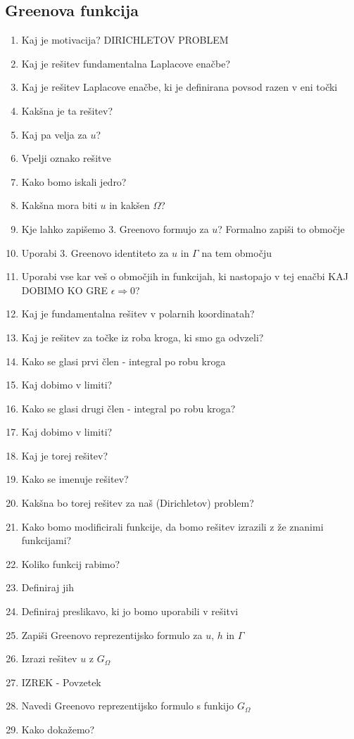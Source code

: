 \documentclass{article}
\begin{document}
    \subsection{Greenova funkcija}
    \begin{enumerate}
        \item Kaj je motivacija?
        DIRICHLETOV PROBLEM
        \item Kaj je rešitev fundamentalna Laplacove enačbe?
        \item Kaj je rešitev Laplacove enačbe, ki je definirana povsod razen v eni točki
        \item Kakšna je ta rešitev?
        \item Kaj pa velja za $u$?
        \item Vpelji oznako rešitve
        \item Kako bomo iskali jedro?
        \item Kakšna mora biti $u$ in kakšen $\Omega$?
        \item Kje lahko zapišemo 3. Greenovo formujo za $u$? Formalno zapiši to območje
        \item Uporabi 3. Greenovo identiteto za $u$ in $\Gamma$ na tem območju
        \item Uporabi vse kar veš o območjih in funkcijah, ki nastopajo v tej enačbi
        KAJ DOBIMO KO GRE $\epsilon \Rightarrow 0$?
        \item Kaj je fundamentalna rešitev v polarnih koordinatah?
        \item Kaj je rešitev za točke iz roba kroga, ki smo ga odvzeli?
        \item Kako se glasi prvi člen - integral po robu kroga
        \item Kaj dobimo v limiti?
        \item Kako se glasi drugi člen - integral po robu kroga?
        \item Kaj dobimo v limiti?
        \item Kaj je torej rešitev?
        \item Kako se imenuje rešitev?
        \item Kakšna bo torej rešitev za naš (Dirichletov) problem?
        \item Kako bomo modificirali funkcije, da bomo rešitev izrazili z že znanimi funkcijami?
        \item Koliko funkcij rabimo?
        \item Definiraj jih
        \item Definiraj preslikavo, ki jo bomo uporabili v rešitvi
        \item Zapiši Greenovo reprezentijsko formulo za $u$, $h$ in $\Gamma$
        \item Izrazi rešitev $u$ z $G_{\Omega}$
        \item IZREK - Povzetek
        \item Navedi Greenovo reprezentijsko formulo s funkijo $G_{\Omega}$ 
        \item Kako dokažemo?
    \end{enumerate}
    
\end{document}
